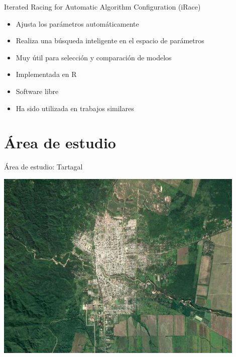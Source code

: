 \documentclass[10pt]{beamer}
\begin{document}
\begin{frame}{Iterated Racing for Automatic Algorithm Configuration (iRace)}
  \begin{itemize}[<+->]
  \item Ajusta los parámetros automáticamente
  \item Realiza una búsqueda inteligente en el espacio de parámetros
  \item Muy útil para selección y comparación de modelos
  \item Implementada en R
  \item Software libre 
  \item Ha sido utilizada en trabajos similares
  \end{itemize}
\end{frame}

\section{Área de estudio}

\begin{frame}{Área de estudio: Tartagal}
  \begin{center}
  \includegraphics[width=0.9\textwidth]{tartagal.jpeg}
  \end{center}

\end{frame}
\end{document}
